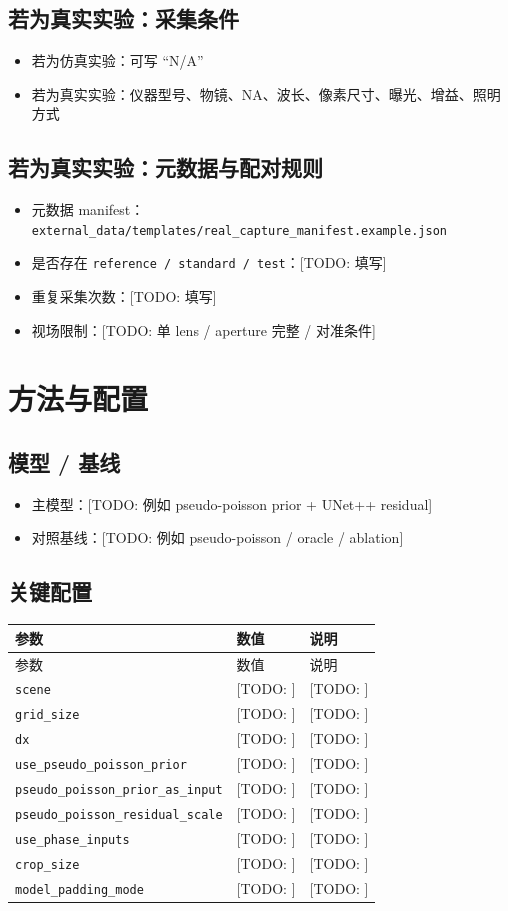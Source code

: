 \documentclass[UTF8,a4paper,11pt]{ctexart}
\newcommand{\InstrumentSummary}{%
\begin{itemize}
  \item 若为仿真实验：可写 ``N/A''
  \item 若为真实实验：仪器型号、物镜、NA、波长、像素尺寸、曝光、增益、照明方式
\end{itemize}
}
\newcommand{\TODO}[1]{\textcolor{red!70!black}{[TODO: #1]}}
\newcommand{\Code}[1]{\texttt{#1}}
\begin{document}
\subsection{若为真实实验：采集条件}
\InstrumentSummary

\subsection{若为真实实验：元数据与配对规则}
\begin{itemize}
  \item 元数据 manifest：\Code{external\_data/templates/real\_capture\_manifest.example.json}
  \item 是否存在 \Code{reference / standard / test}：\TODO{填写}
  \item 重复采集次数：\TODO{填写}
  \item 视场限制：\TODO{单 lens / aperture 完整 / 对准条件}
\end{itemize}

\section{方法与配置}

\subsection{模型 / 基线}
\begin{itemize}
  \item 主模型：\TODO{例如 pseudo-poisson prior + UNet++ residual}
  \item 对照基线：\TODO{例如 pseudo-poisson / oracle / ablation}
\end{itemize}

\subsection{关键配置}
\begin{longtable}{p{} p{} p{}}
\toprule
参数 & 数值 & 说明 \\
\midrule
\endfirsthead
\toprule
参数 & 数值 & 说明 \\
\midrule
\endhead
\Code{scene} & \TODO{} & \TODO{} \\
\Code{grid\_size} & \TODO{} & \TODO{} \\
\Code{dx} & \TODO{} & \TODO{} \\
\Code{use\_pseudo\_poisson\_prior} & \TODO{} & \TODO{} \\
\Code{pseudo\_poisson\_prior\_as\_input} & \TODO{} & \TODO{} \\
\Code{pseudo\_poisson\_residual\_scale} & \TODO{} & \TODO{} \\
\Code{use\_phase\_inputs} & \TODO{} & \TODO{} \\
\Code{crop\_size} & \TODO{} & \TODO{} \\
\Code{model\_padding\_mode} & \TODO{} & \TODO{} \\
\bottomrule
\end{longtable}
\end{document}
